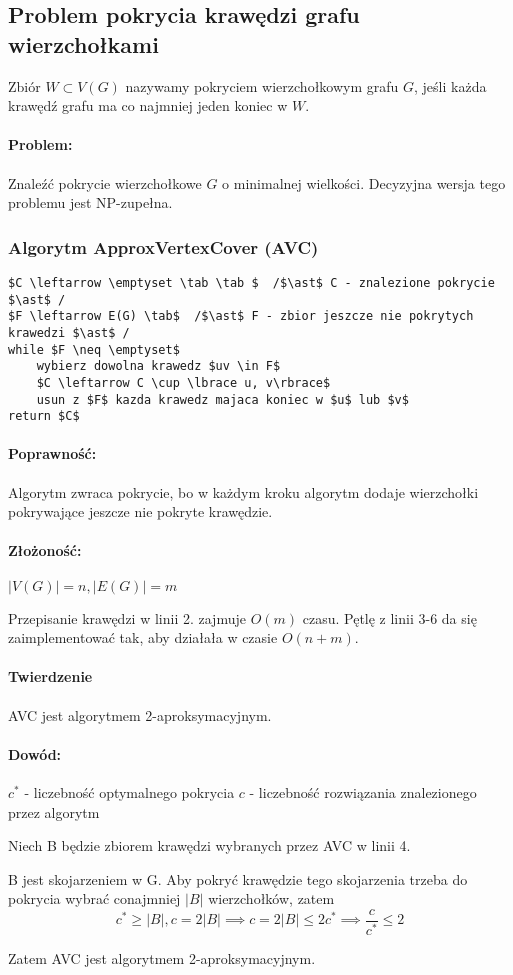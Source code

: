 \subsection{Problem pokrycia krawędzi grafu wierzchołkami}
Zbiór $W \subset V(G)$ nazywamy pokryciem wierzchołkowym grafu $G$, jeśli każda krawędź grafu ma co najmniej jeden koniec w $W$.

\paragraph{Problem: }Znaleźć pokrycie wierzchołkowe $G$ o minimalnej wielkości. Decyzyjna wersja tego problemu jest NP-zupełna.

\subsubsection{Algorytm ApproxVertexCover (AVC)}
\begin{lstlisting}[caption={AVC(G)}]
$C \leftarrow \emptyset \tab \tab $  /$\ast$ C - znalezione pokrycie $\ast$ /
$F \leftarrow E(G) \tab$  /$\ast$ F - zbior jeszcze nie pokrytych krawedzi $\ast$ /
while $F \neq \emptyset$
	wybierz dowolna krawedz $uv \in F$
	$C \leftarrow C \cup \lbrace u, v\rbrace$
	usun z $F$ kazda krawedz majaca koniec w $u$ lub $v$
return $C$
\end{lstlisting}

\paragraph{Poprawność: } Algorytm zwraca pokrycie, bo w każdym kroku algorytm dodaje wierzchołki pokrywające jeszcze nie pokryte krawędzie.

\paragraph{Złożoność: } $|V(G)| =  n, |E(G)| = m$

Przepisanie krawędzi w linii 2. zajmuje $O(m)$ czasu.
Pętlę z linii 3-6 da się zaimplementować tak, aby działała w czasie $O(n+m)$.

\paragraph{Twierdzenie }AVC jest algorytmem 2-aproksymacyjnym.

\paragraph{Dowód:}
$c^{\ast}$ - liczebność optymalnego pokrycia
$c$ - liczebność rozwiązania znalezionego przez algorytm

Niech B będzie zbiorem krawędzi wybranych przez AVC w linii 4.

B jest skojarzeniem w G. Aby pokryć krawędzie tego skojarzenia trzeba do pokrycia wybrać conajmniej $|B|$ wierzchołków, zatem $$c^{\ast} \geq \vert B \vert, c = 2\vert B\vert \implies c = 2\vert B\vert \leq 2c^{\ast} \implies \frac{c}{c^{\ast}} \leq 2$$

Zatem AVC jest algorytmem 2-aproksymacyjnym.
